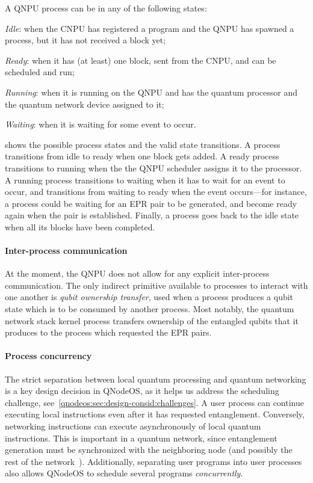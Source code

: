 A \ac{QNPU} process can be in any of the following states:
%
\begin{inlinelist}
\item \emph{Idle}: when the \ac{CNPU} has registered a program and the \ac{QNPU} has spawned a process, but it has not received a block yet;
\item \emph{Ready}: when it has (at least) one block, sent from the \ac{CNPU}, and can be scheduled and run;
\item \emph{Running}: when it is running on the \ac{QNPU} and has the quantum processor and the quantum network device assigned to it;
\item \emph{Waiting}: when it is waiting for some event to occur.
\end{inlinelist}
%
 shows the possible process states and the valid state transitions. A process transitions from idle to ready when one block gets added. A ready process transitions to running when the the \ac{QNPU} scheduler assigns it to the processor. A running process transitions to waiting when it has to wait for an event to occur, and transitions from waiting to ready when the event occurs---for instance, a process could be waiting for an \ac{EPR} pair to be generated, and become ready again when the pair is established. Finally, a process goes back to the idle state when all its blocks have been completed.

\paragraph{Inter-process communication}

At the moment, the \ac{QNPU} does not allow for any explicit inter-process communication. The only indirect primitive available to processes to interact with one another is \emph{qubit ownership transfer}, used when a process produces a qubit state which is to be consumed by another process. Most notably, the quantum network stack kernel process transfers ownership of the entangled qubits that it produces to the process which requested the \ac{EPR} pairs.

\paragraph{Process concurrency}

The strict separation between local quantum processing and quantum networking is a key design decision in \ac{QNodeOS}, as it helps us address the scheduling challenge, see~\cref{qnodeos:sec:design-consid:challenges}. A user process can continue executing local instructions even after it has requested entanglement. Conversely, networking instructions can execute asynchronously of local quantum instructions. This is important in a quantum network, since entanglement generation must be synchronized with the neighboring node (and possibly the rest of the network~\cite{skrzypczyk_2021_arch}). Additionally, separating user programs into user processes also allows \ac{QNodeOS} to schedule several programs \emph{concurrently}.

